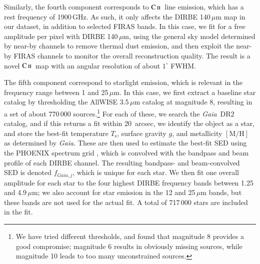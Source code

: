 \documentclass{aa}
\def\GAIA{\textit{Gaia}}
\newcommand{\CII}{\ensuremath{\textsc{C\,ii}}}
\begin{document}
Similarly, the fourth component corresponds to \CII\ line emission,
which has a rest frequency of 1900\,GHz. As such, it only affects the
DIRBE 140\,$\mu$m map in our dataset, in addition to selected FIRAS
bands. In this case, we fit for a free amplitude per pixel with DIRBE
140\,$\mu$m, using the general sky model determined by near-by
channels to remove thermal dust emission, and then exploit the near-by
FIRAS channels to monitor the overall reconstruction
quality. The result is a novel \CII\ map with an angular resolution of
about $1^{\circ}$ FWHM.

The fifth component correspond to starlight emission, which is
relevant in the frequency range between 1 and 25\,$\mu$m. In this
case, we first extract a baseline star catalog by thresholding the
AllWISE 3.5\,$\mu$m catalog at magnitude 8, resulting in a set of about
770\,000 sources.\footnote{We have tried different thresholds, and
found that magnitude 8 provides a good compromise; magnitude 6 results
in obviously missing sources, while magnitude 10 leads to too many
unconstrained sources.} For each of these, we search the \GAIA\ DR2
catalog, and if this returns a fit within 20~arcsec, we identify the
object as a star, and store the best-fit temperature $T_\mathrm{s}$,
surface gravity $g$, and metallicity $[\mathrm{M}/\mathrm{H}]$ as
determined by \GAIA. These are then used to estimate the best-fit SED
using the PHOENIX spectrum grid \citep{husser:2013}, which is convolved with the
bandpass and beam profile of each DIRBE channel. The resulting
bandpass- and beam-convolved SED is denoted $f_{\GAIA,j}$,
which is unique for each star. We then fit one overall amplitude for
each star to the four highest DIRBE frequency bands between 1.25 and
4.9\,$\mu$m; we also account for star emission in the 12 and
25\,$\mu$m bands, but these bands are not used for the actual fit. A
total of 717\,000 stars are included in the fit.
\end{document}
